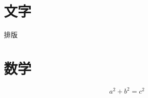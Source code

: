\documentclass[UTF8]{ctexart} %
\begin{document}
  \section{文字} %
  排版
  \section{数学}
  \[
    a^2 +b^2 = c^2
  \]
\end{document}
